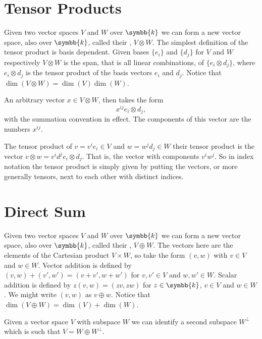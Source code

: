 \documentclass[fleqn]{NotesClass}
\renewcommand{\field}{\symbb{k}}
\begin{document}
\begin{appendices}
        \section{Tensor Products}\label{sec:tensor products}
        Given two vector spaces \(V\) and \(W\) over \(\field\) we can form a new vector space, also over \(\field\), called their , \(V \otimes W\).
        The simplest definition of the tensor product is basis dependent.
        Given bases \(\{e_i\}\) and \(\{d_j\}\) for \(V\) and \(W\) respectively \(V \otimes W\) is the span, that is all linear combinations, of \(\{e_i \otimes d_j\}\), where \(e_i \otimes d_j\) is the tensor product of the basis vectors \(e_i\) and \(d_j\).
        Notice that \(\dim(V \otimes W) = \dim(V) \dim(W)\).
        
        An arbitrary vector \(x \in V \otimes W\), then takes the form
        \begin{equation}
            x^{ij}e_i \otimes d_j,
        \end{equation}
        with the summation convention in effect.
        The components of this vector are the numbers \(x^{ij}\).
        
        The tensor product of \(v = v^ie_i \in V\) and \(w = w^jd_j \in W\) their tensor product is the vector \(v \otimes w = v^id^j e_i \otimes d_j\).
        That is, the vector with components \(v^iw^j\).
        So in index notation the tensor product is simply given by putting the vectors, or more generally tensors, next to each other with distinct indices.
        
        \section{Direct Sum}\label{sec:direct sums}
        Given two vector spaces \(V\) and \(W\) over \(\field\) we can form a new vector space, also over \(\field\), called their , \(V \oplus W\).
        The vectors here are the elements of the Cartesian product \(V \times W\), so take the form \((v, w)\) with \(v \in V\) and \(w \in W\).
        Vector addition is defined by \((v, w) + (v', w') = (v + v', w + w')\) for \(v, v' \in V\) and \(w, w' \in W\).
        Scalar addition is defined by \(z(v, w) = (zv, zw)\) for \(z \in \field\), \(v \in V\) and \(w \in W\).
        We might write \((v, w)\) as \(v \oplus w\).
        Notice that \(\dim(V \oplus W) = \dim(V) + \dim(W)\).
        
        Given a vector space \(V\) with subspace \(W\) we can identify a second subspace \(W^{\perp}\) which is such that \(V = W \oplus W^{\perp}\).
        

\end{appendices}
\end{document}
